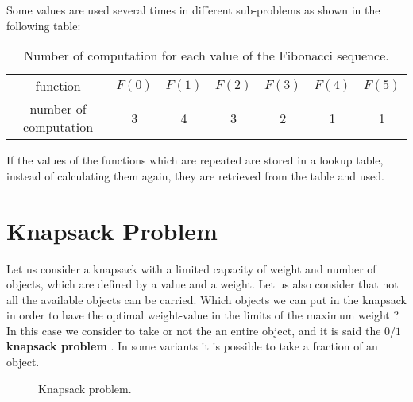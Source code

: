 Some values are used several times in different sub-problems as shown in the following table:
\begin{table}[H]
	\centering
	\begin{tabular}{c c c c c c c}
	function & $F(0)$ & $F(1)$ & $F(2)$ & $F(3)$ & $F(4)$ & $F(5)$ \\
	number of computation & 3 & 4 & 3 & 2 & 1 & 1
	\end{tabular}
	\caption[Number of computation for each value of the Fibonacci sequence.]{Number of computation for each value of the Fibonacci sequence.}
\end{table}
If the values of the functions which are repeated are stored in a lookup table, instead of calculating them again, they are retrieved from the table and used.

\section{Knapsack Problem}
Let us consider a knapsack with a limited capacity of weight and number of objects, which are defined by a value and a weight. Let us also consider that not all the available objects can be carried. Which objects we can put in the knapsack in order to have the optimal weight-value in the limits of the maximum weight \cite{wikiknapsackproblem}? In this case we consider to take or not the an entire object, and it is said the \textbf{\(0/1\) knapsack problem} . In some variants it is possible to take a fraction of an object.

\begin{figure}[H]
\centering
{}
\caption[Knapsack problem.]{Knapsack problem.}
\end{figure}

